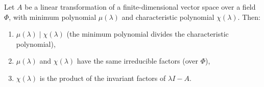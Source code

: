 Let $A$ be a linear transformation of a finite-dimensional vector space over a field $\Phi$, with minimum polynomial $\mu(\lambda)$ and characteristic polynomial $\chi(\lambda)$. Then:
\begin{enumerate}
\item $\mu(\lambda) \mid \chi(\lambda)$ (the minimum polynomial divides the characteristic polynomial),
\item $\mu(\lambda)$ and $\chi(\lambda)$ have the same irreducible factors (over $\Phi$),
\item $\chi(\lambda)$ is the product of the invariant factors of $\lambda I - A$.
\end{enumerate}
